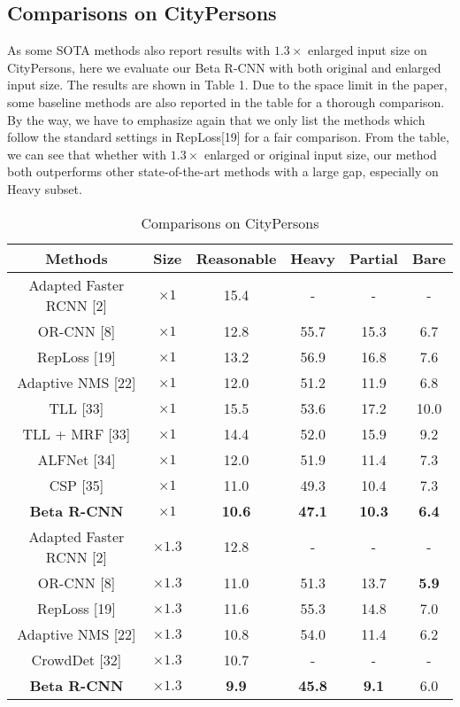\documentclass{article}
\begin{document}
\subsection{Comparisons on CityPersons}
As some  SOTA methods also report results with $1.3 \times$ enlarged input size on CityPersons, here we evaluate our Beta R-CNN with both original and enlarged input size. The results are shown in Table 1. Due to the space limit in the paper, some baseline methods are also reported in the table for a thorough comparison.
By the way, we have to emphasize again that we only list the methods which follow the standard settings in RepLoss[19] for a fair comparison. 
From the table, we can see that whether with $1.3\times$ enlarged or original input size, our method both outperforms other state-of-the-art methods with a large gap, especially on Heavy subset.
\begin{table}[htbp]
    \centering
    \caption{Comparisons on CityPersons}
    \begin{tabular}{cccccc}
        \toprule
        Methods & Size &  Reasonable & Heavy & Partial & Bare \\
        \midrule
        Adapted Faster RCNN [2] & $\times 1$ & 15.4 & - & - & - \\
        OR-CNN [8]& $\times 1$ & 12.8 & 55.7 & 15.3 & 6.7 \\
        RepLoss [19]& $\times 1$ & 13.2 & 56.9 & 16.8 & 7.6 \\
        Adaptive NMS [22]& $\times 1$ & 12.0 & 51.2 & 11.9 & 6.8 \\
        TLL [33]& $\times 1$ & 15.5 & 53.6 & 17.2 & 10.0 \\
        TLL + MRF [33]& $\times 1$ & 14.4 & 52.0 & 15.9 & 9.2 \\
        ALFNet [34] & $\times 1$ & 12.0 & 51.9 & 11.4 & 7.3 \\
        CSP [35]& $\times 1$ & 11.0 & 49.3 & 10.4 & 7.3 \\
        \midrule
        
        \textbf{Beta R-CNN} & $\times 1$ &  \textbf{10.6} &  \textbf{47.1} &  \textbf{10.3} &  \textbf{6.4} \\
        \midrule
        \midrule
        Adapted Faster RCNN [2]& $\times 1.3$ & 12.8 & - & - & - \\
        OR-CNN [8]& $\times 1.3$ & 11.0 & 51.3 & 13.7 & \textbf{5.9} \\
        RepLoss [19]& $\times 1.3$ & 11.6 & 55.3 & 14.8 & 7.0 \\
        Adaptive NMS [22]& $\times 1.3$ & 10.8 & 54.0 & 11.4 & 6.2 \\
        CrowdDet [32]& $\times 1.3$ & 10.7 & - & - & - \\
        \midrule
        \textbf{Beta R-CNN} & $\times 1.3$ &  \textbf{9.9} &  \textbf{45.8} &  \textbf{9.1} & 6.0 \\
        \bottomrule
    \end{tabular}
    \label{tab:my_label}
\end{table}
\end{document}
